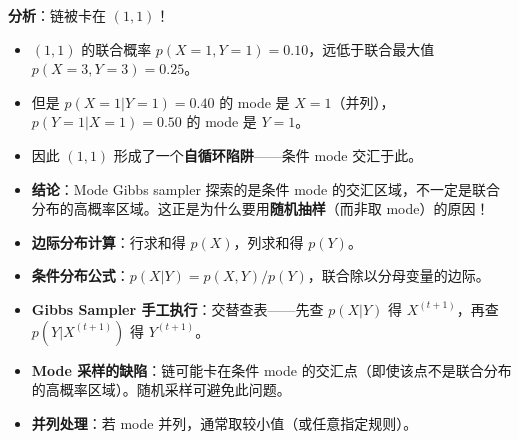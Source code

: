 \documentclass[11pt,a4paper]{article}
\begin{document}
\begin{center}
\end{center}

\textbf{分析}：链被卡在 $(1,1)$！

\begin{itemize}
    \item $(1,1)$ 的联合概率 $p(X\!=\!1, Y\!=\!1) = 0.10$，远低于联合最大值 $p(X\!=\!3, Y\!=\!3) = 0.25$。
    \item 但是 $p(X\!=\!1 | Y\!=\!1) = 0.40$ 的 mode 是 $X=1$（并列），$p(Y\!=\!1 | X\!=\!1) = 0.50$ 的 mode 是 $Y=1$。
    \item 因此 $(1,1)$ 形成了一个\textbf{自循环陷阱}——条件 mode 交汇于此。
    \item \textbf{结论}：Mode Gibbs sampler 探索的是条件 mode 的交汇区域，不一定是联合分布的高概率区域。这正是为什么要用\textbf{随机抽样}（而非取 mode）的原因！
\end{itemize}

\begin{knowledgebox}[Q2 知识点总结]
\begin{itemize}
    \item \textbf{边际分布计算}：行求和得 $p(X)$，列求和得 $p(Y)$。
    \item \textbf{条件分布公式}：$p(X|Y) = p(X,Y) / p(Y)$，联合除以分母变量的边际。
    \item \textbf{Gibbs Sampler 手工执行}：交替查表——先查 $p(X|Y)$ 得 $X^{(t+1)}$，再查 $p(Y|X^{(t+1)})$ 得 $Y^{(t+1)}$。
    \item \textbf{Mode 采样的缺陷}：链可能卡在条件 mode 的交汇点（即使该点不是联合分布的高概率区域）。随机采样可避免此问题。
    \item \textbf{并列处理}：若 mode 并列，通常取较小值（或任意指定规则）。
\end{itemize}
\end{knowledgebox}

\vspace{0.5cm}

\end{document}
